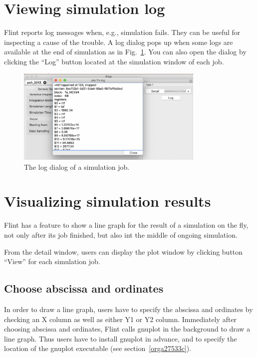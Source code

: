 \documentclass[a4paper,10pt]{report}
\begin{document}
\section{Viewing simulation log}
\label{sec:org7f76600}
Flint reports log messages when, e.g., simulation fails.
They can be useful for inspecting a cause of the trouble.
A log dialog pops up when some logs are available at the end of simulation as in Fig.~\ref{fig:org400e048}.
You can also open the dialog by clicking the ``Log'' button located at the simulation window of each job.

\begin{figure}[htbp]
\centering
\includegraphics[width=0.8\textwidth]{image/log.png}
\caption{\label{fig:org400e048}The log dialog of a simulation job.}
\end{figure}

\section{Visualizing simulation results}
\label{sec:org41ae381}
Flint has a feature to show a line graph for the result of a simulation on the
fly, not only after its job finished, but also int the middle of ongoing
simulation.

From the detail window, users can display the plot window by clicking button
``View'' for each simulation job.

\subsection{Choose abscissa and ordinates}
\label{sec:org1f653ce}
In order to draw a line graph, users have to specify the abscissa and ordinates
by checking an X column as well as either Y1 or Y2 column.
Immediately after choosing abscissa and ordinates, Flint calls gnuplot in the
background to draw a line graph.
Thus users have to install gnuplot in advance, and to specify the location of
the gnuplot executable (see section~\ref{orga27533c}).
\end{document}
